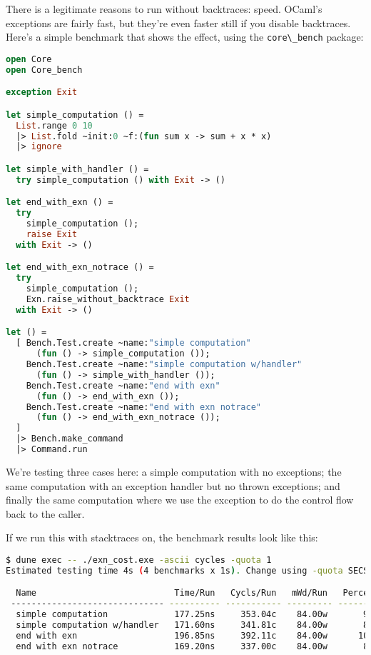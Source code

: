 There is a legitimate reasons to run without backtraces: speed. OCaml's
exceptions are fairly fast, but they're even faster still if you disable
backtraces. Here's a simple benchmark that shows the effect, using the
\passthrough{\lstinline!core\_bench!} package:

\begin{lstlisting}[language=Caml]
open Core
open Core_bench

exception Exit

let simple_computation () =
  List.range 0 10
  |> List.fold ~init:0 ~f:(fun sum x -> sum + x * x)
  |> ignore

let simple_with_handler () =
  try simple_computation () with Exit -> ()

let end_with_exn () =
  try
    simple_computation ();
    raise Exit
  with Exit -> ()

let end_with_exn_notrace () =
  try
    simple_computation ();
    Exn.raise_without_backtrace Exit
  with Exit -> ()

let () =
  [ Bench.Test.create ~name:"simple computation"
      (fun () -> simple_computation ());
    Bench.Test.create ~name:"simple computation w/handler"
      (fun () -> simple_with_handler ());
    Bench.Test.create ~name:"end with exn"
      (fun () -> end_with_exn ());
    Bench.Test.create ~name:"end with exn notrace"
      (fun () -> end_with_exn_notrace ());
  ]
  |> Bench.make_command
  |> Command.run
\end{lstlisting}

We're testing three cases here: a simple computation with no exceptions;
the same computation with an exception handler but no thrown exceptions;
and finally the same computation where we use the exception to do the
control flow back to the caller.

If we run this with stacktraces on, the benchmark results look like
this:

\begin{lstlisting}[language=bash]
$ dune exec -- ./exn_cost.exe -ascii cycles -quota 1
Estimated testing time 4s (4 benchmarks x 1s). Change using -quota SECS.

  Name                           Time/Run   Cycls/Run   mWd/Run   Percentage
 ------------------------------ ---------- ----------- --------- ------------
  simple computation             177.25ns     353.04c    84.00w       90.04%
  simple computation w/handler   171.60ns     341.81c    84.00w       87.17%
  end with exn                   196.85ns     392.11c    84.00w      100.00%
  end with exn notrace           169.20ns     337.00c    84.00w       85.95%
\end{lstlisting}


